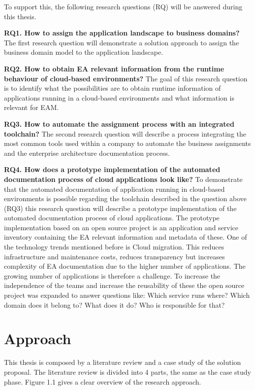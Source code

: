 To support this, the following research questions (RQ) will be answered during this thesis.

\textbf{RQ1. How to assign the application landscape to business domains?}
The first research question will demonstrate a solution approach to assign the business domain model to the application landscape.

\textbf{RQ2. How to obtain EA relevant information from the runtime behaviour of cloud-based environments?}
The goal of this research question is to identify what the possibilities are to obtain runtime information of applications running in a cloud-based environments and what information is relevant for EAM.

\textbf{RQ3. How to automate the assignment process with an integrated toolchain?}
The second research question will describe a process integrating the most common tools used within a company to automate the business assignments and the enterprise architecture documentation process.

\textbf{RQ4. How does a prototype implementation of the automated documentation process of cloud applications look like?}
To demonstrate that the automated documentation of application running in cloud-based environments is possible regarding the toolchain described in the question above (RQ3) this research question will describe a prototype implementation of the automated documentation process of cloud applications. The prototype implementation based on an open source project is an application and service inventory containing the EA relevant information and metadata of these. One of the technology trends mentioned before is Cloud migration. This reduces infrastructure and maintenance costs, reduces transparency but increases complexity of EA documentation due to the higher number of applications. The growing number of applications is therefore a challenge. To increase the independence of the teams and increase the reusability of these %
the open source project was expanded to answer questions like: Which service runs where? Which domain does it belong to? What does it do? Who is responsible for that?


\section{Approach}
This thesis is composed by a literature review and a case study of the solution proposal. The literature review is divided into 4 parts, the same as the case study phase. Figure 1.1 gives a clear overview of the research approach.

